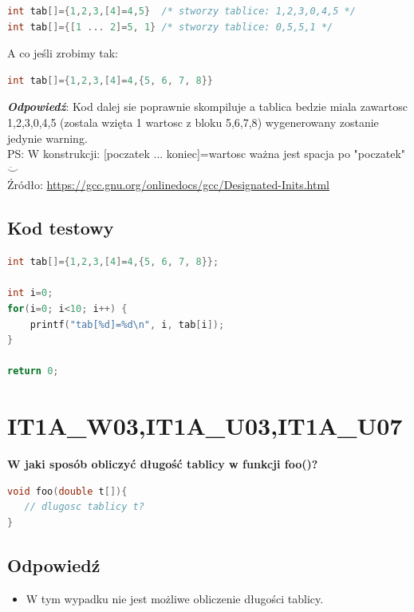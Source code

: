 \begin{lstlisting}[language=c]
int tab[]={1,2,3,[4]=4,5}  /* stworzy tablice: 1,2,3,0,4,5 */
int tab[]={[1 ... 2]=5, 1} /* stworzy tablice: 0,5,5,1 */
\end{lstlisting}
	
A co jeśli zrobimy tak:
\begin{lstlisting}[language=c]
int tab[]={1,2,3,[4]=4,{5, 6, 7, 8}}
\end{lstlisting}

\textbf{\textit{Odpowiedź}}: Kod dalej sie poprawnie skompiluje a tablica bedzie miala zawartosc 1,2,3,0,4,5 (zostala wzięta 1 wartosc z bloku {5,6,7,8}) wygenerowany zostanie jedynie warning.\\
	
PS: W konstrukcji: [poczatek ... koniec]=wartosc ważna jest spacja po "poczatek"  $\ddot\smile$\\
	
Źródło: \href{https://gcc.gnu.org/onlinedocs/gcc/Designated-Inits.html}{https://gcc.gnu.org/onlinedocs/gcc/Designated-Inits.html}

\subsection{Kod testowy}
\begin{lstlisting}[language=c]
int tab[]={1,2,3,[4]=4,{5, 6, 7, 8}};

int i=0;
for(i=0; i<10; i++) {
	printf("tab[%d]=%d\n", i, tab[i]);
}
	
return 0;
\end{lstlisting}

\section{IT1A\_W03,IT1A\_U03,IT1A\_U07} 
\textbf{W jaki sposób obliczyć długość tablicy w funkcji foo()?}
\begin{lstlisting}[language=c]
void foo(double t[]){
   // dlugosc tablicy t?
}
\end{lstlisting}

\subsection{Odpowiedź}
\begin{itemize}
\item W tym wypadku nie jest możliwe obliczenie długości tablicy.\\
\end{itemize}

